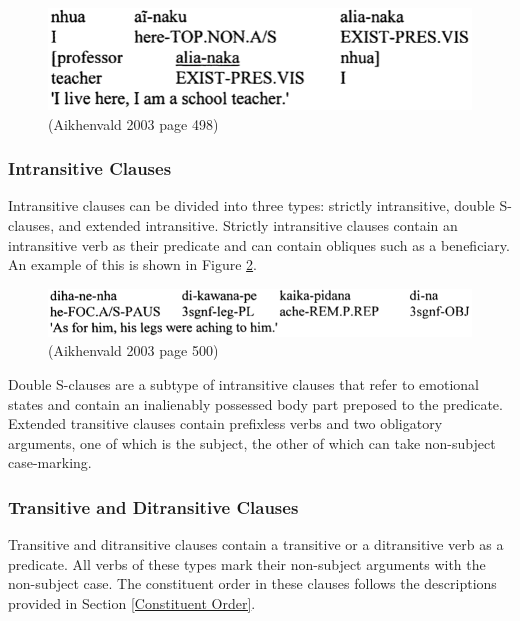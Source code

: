 \documentclass{article}
\begin{document}
\begin{figure}[h!]
\centering
\includegraphics[scale = 0.4]{schoolteacher.png}
	\caption{(Aikhenvald 2003 page 498)}
	\label{schoolteacher}
\end{figure}

\subsubsection{Intransitive Clauses}
Intransitive clauses can be divided into three types: strictly intransitive, double S-clauses, and extended intransitive. Strictly intransitive clauses contain an intransitive verb as their predicate and can contain obliques such as a beneficiary. An example of this is shown in Figure \ref*{legsaching}.

\begin{figure}[h!]
\centering
\includegraphics[scale = 0.4]{legsaching.png}
	\caption{(Aikhenvald 2003 page 500)}
	\label{legsaching}
\end{figure}

Double S-clauses are a subtype of intransitive clauses that refer to emotional states and contain an inalienably possessed body part preposed to the predicate. Extended transitive clauses contain prefixless verbs and two obligatory arguments, one of which is the subject, the other of which can take non-subject case-marking.

\subsubsection{Transitive and Ditransitive Clauses}
Transitive and ditransitive clauses contain a transitive or a ditransitive verb as a predicate. All verbs of these types mark their non-subject arguments with the non-subject case. The constituent order in these clauses follows the descriptions provided in Section \ref*{Constituent Order}.

\end{document}
